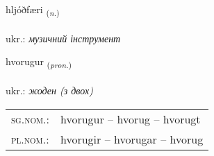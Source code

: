 \documentclass[frontgrid, backgrid]{flacards}\usepackage[]{graphicx}\usepackage[]{xcolor}
\begin{document}
\renewcommand{\flhead}{\vskip5pt \fboxsep=0pt {\small\bfseries\footnotesize Nafnorð | іменник}}
\renewcommand{\fcfoot}{\vskip5pt \fboxsep=0pt \hspace{2pt}{\small\bfseries\footnotesize 3K}}

\renewcommand{\blhead}{\vskip5pt {\small\bfseries\footnotesize Nafnorð | іменник }}
\renewcommand{\bcfoot}{\vskip5pt \hspace{2pt}{\small\bfseries\footnotesize 3K}}


{hljóðfæri \small{\textsubscript{(\textit{n.})}} \\[1ex] %
\textphonetic{[l̥jouðfairɪ]} \\
ukr.: \emph{музичний інструмент} \\  [2ex]
\renewcommand*{\arraystretch}{0.8}
}

\renewcommand{\flhead}{\vskip5pt \fboxsep=0pt {\small\bfseries\footnotesize Fornafn | займенник}}
\renewcommand{\fcfoot}{\vskip5pt \fboxsep=0pt \hspace{2pt}{\small\bfseries\footnotesize 3K}}

\renewcommand{\blhead}{\vskip5pt {\small\bfseries\footnotesize Fornafn | займенник }}
\renewcommand{\bcfoot}{\vskip5pt \hspace{2pt}{\small\bfseries\footnotesize 3K}}


{hvorugur \small{\textsubscript{(\textit{pron.})}} \\[1ex] %
\textphonetic{[kʰvɔːrʏɣʏr]} \\
ukr.: \emph{жоден (з двох)} \\  [2ex]
\renewcommand*{\arraystretch}{0.8}
\begin{tabular}{ll}
\textsc{sg.nom.}: & hvorugur  --  hvorug -- hvorugt \\ 
\textsc{pl.nom.}: & hvorugir -- hvorugar -- hvorug
\end{tabular}
}
\end{document}
